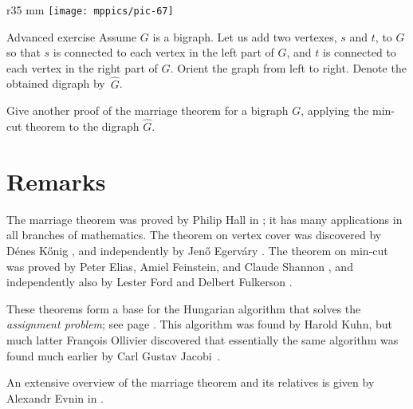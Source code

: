 {

\begin{wrapfigure}{r}{35 mm}
\vskip-0mm
\centering
\texttt{[image: mppics/pic-67]}
\end{wrapfigure}

\begin{thm}{Advanced exercise}
Assume $G$ is a bigraph.
Let us add two vertexes, $s$ and $t$, to $G$ so that $s$ is connected to each vertex in the left part of $G$, and $t$ is connected to each vertex in the right part of $G$.
Orient the graph from left to right.
Denote the obtained digraph by~$\hat G$.

Give another proof of the marriage theorem for a bigraph $G$, applying the min-cut theorem to the digraph $\hat G$. 
\end{thm}

}


\section*{Remarks}

The marriage theorem was proved by Philip Hall in \cite{hall};
it has many applications in all branches of mathematics.
The theorem on vertex cover was discovered by D\'enes K\H{o}nig \cite{konig}, and independently by Jen\H{o} Egerv\'ary \cite{egervary}.
The theorem on min-cut was proved by Peter Elias, Amiel Feinstein, and Claude Shannon \cite{elias-feinstein-shannon}, 
and independently also by Lester Ford and Delbert Fulkerson \cite{ford-fulkerson}.

These theorems form a base for the Hungarian algorithm that solves the \emph{assignment problem}; see page \pageref{assignment problem}.
This algorithm was found by Harold Kuhn, but much latter François Ollivier discovered that essentially the same algorithm was found much earlier by Carl Gustav Jacobi~\cite{ollivier}.

An extensive overview of the marriage theorem and its relatives is given by Alexandr Evnin in \cite{evnin}.

